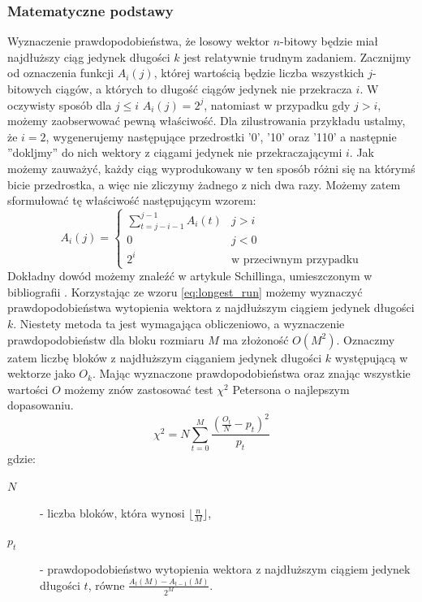 \subsubsection{Matematyczne podstawy}
Wyznaczenie prawdopodobieństwa, że losowy wektor $n$-bitowy będzie miał najdłuższy ciąg jedynek długości $k$ jest relatywnie trudnym zadaniem. Zacznijmy od oznaczenia funkcji $A_i(j)$, której wartością będzie liczba wszystkich $j$-bitowych ciągów, a których to długość ciągów jedynek nie przekracza $i$. W oczywisty sposób dla $j \leq i$ $A_i(j) = 2^j$, natomiast w przypadku gdy $j > i$, możemy zaobserwować pewną właściwość. Dla zilustrowania przykładu ustalmy, że $i = 2$, wygenerujemy następujące przedrostki '0', '10' oraz '110' a następnie ''dokljmy'' do nich wektory z ciągami jedynek nie przekraczającymi $i$. Jak możemy zauważyć, każdy ciąg wyprodukowany w ten sposób różni się na którymś bicie przedrostka, a więc nie zliczymy żadnego z nich dwa razy. Możemy zatem sformułować tę właściwość następującym wzorem:
\begin{equation}
    \label{eq:longest_run}
    A_i(j) = \begin{cases}
    \sum_{t=j-i-1}^{j-1}A_i(t) &j > i\\
    0 &j < 0 \\
    2^i &\textrm{w przeciwnym przypadku}
    \end{cases}
\end{equation}
Dokładny dowód możemy znaleźć w artykule Schillinga, umieszczonym w bibliografii \cite{longest_run}. Korzystając ze wzoru \ref{eq:longest_run} możemy wyznaczyć prawdopodobieństwa wytopienia wektora z najdłuższym ciągiem jedynek długości $k$. Niestety metoda ta jest wymagająca obliczeniowo, a wyznaczenie prawdopodobieństw dla bloku rozmiaru $M$ ma złożoność $O(M^2)$. Oznaczmy zatem liczbę bloków z najdłuższym ciąganiem jedynek długości $k$ występującą w wektorze jako $O_k$. Mając wyznaczone prawdopodobieństwa oraz znając wszystkie wartości $O$ możemy znów zastosować test $\chi^2$ Petersona o najlepszym dopasowaniu.
\begin{equation}
    \chi^2 = N\sum_{t=0}^M{\frac{(\frac{O_t}{N}-p_t)^2}{p_t}}
\end{equation}
gdzie:
\begin{description}
    \item[$N$] - liczba bloków, która wynosi $\lfloor \frac{n}{M} \rfloor$,
    \item[$p_t$] - prawdopodobieństwo wytopienia wektora z najdłuższym ciągiem jedynek długości $t$, równe $\frac{A_t(M) - A_{t-1}(M)}{2^M}$.
\end{description}
